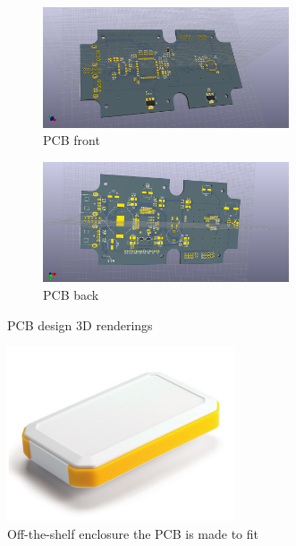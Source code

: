 \documentclass[12pt,a4paper,notitlepage]{article}
\begin{document}
\begin{figure}[H]
    \centering
    \begin{subfigure}[b]{0.8\textwidth}
        \centering
        \includegraphics[width=0.8\textwidth]{pcb_front.png}
        \caption{PCB front}
    \end{subfigure} %
    \begin{subfigure}[b]{0.8\textwidth}
        \centering
        \includegraphics[width=0.8\textwidth]{pcb_back.png}
        \caption{PCB back}
    \end{subfigure}
    \caption{PCB design 3D renderings}
    \label{fig:pcb3d}
\end{figure}

\begin{figure}[H]
    \centering
    \includegraphics[width=0.6\textwidth]{takachi_case.png}
    \caption{Off-the-shelf enclosure the PCB is made to fit}
    \label{fig:case}
\end{figure}
\end{document}
